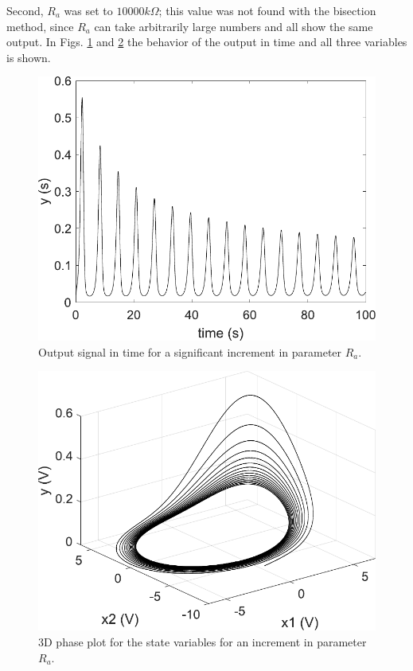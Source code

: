     Second, $R_a$ was set to $10000k\Omega$; this value was not found with the bisection method, since $R_a$ can take arbitrarily large numbers and all show the same output. In Figs. \ref{fig:outParaAup} and \ref{fig:3dParaAup} the behavior of the output in time and all three variables is shown.
    \begin{figure}[H]
        \centering
        \includegraphics[scale=0.5]{figs/outParaAup.pdf}
        \caption{Output signal in time for a significant increment in parameter $R_a$.}
        \label{fig:outParaAup}
    \end{figure}
    \begin{figure}[H]
        \centering
        \includegraphics[scale=0.5]{figs/3dParaAup.pdf}
        \caption{3D phase plot for the state variables for an increment in parameter $R_a$.}
        \label{fig:3dParaAup}
    \end{figure}
    
